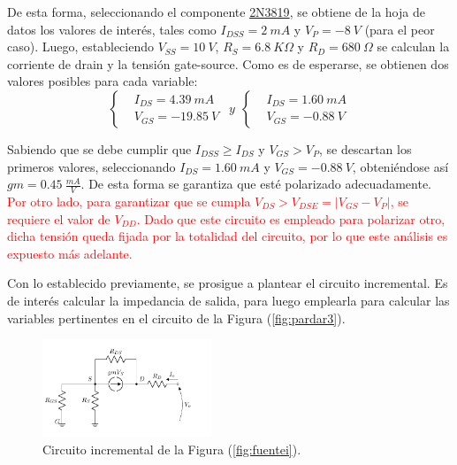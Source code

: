 De esta forma, seleccionando el componente \href{https://www.onsemi.com/pub/Collateral/2N3819-D.PDF}{2N3819}, se obtiene de la hoja de datos los valores de interés, tales como $I_{DSS} = 2 \ mA$ y $V_P = -8 \ V$ (para el peor caso). Luego, estableciendo $V_{SS} = 10 \ V$, $R_S = 6.8 \ K\Omega$ y $R_D = 680 \ \Omega$ se calculan la corriente de drain y la tensión gate-source. Como es de esperarse, se obtienen dos valores posibles para cada variable:
\begin{equation*}
\left\lbrace
\begin{split}
	&I_{DS} =  4.39 \ mA \\
	&V_{GS} =  -19.85 \ V
\end{split}
\right.
\ \ y \ \
\left\lbrace
\begin{split}
	&I_{DS} =  1.60 \ mA \\
	&V_{GS} =  -0.88 \ V
\end{split}
\right.
\end{equation*}

Sabiendo que se debe cumplir que $I_{DSS} \geq I_{DS}$ y $V_{GS} > V_{P}$, se descartan los primeros valores, seleccionando $I_{DS} = 1.60 \ mA$ y $V_{GS} = -0.88 \ V$, obteniéndose así $gm = 0.45 \ \frac{mA}{V}$. De esta forma se garantiza que esté polarizado adecuadamente. \textcolor{red}{Por otro lado, para garantizar que se cumpla $V_{DS} > V_{DSE} = |V_{GS} - V_P|$, se requiere el valor de $V_{DD}$. Dado que este circuito es empleado para polarizar otro, dicha tensión queda fijada por la totalidad del circuito, por lo que este análisis es expuesto más adelante.}

Con lo establecido previamente, se prosigue a plantear el circuito incremental. Es de interés calcular la impedancia de salida, para luego emplearla para calcular las variables pertinentes en el circuito de la Figura (\ref{fig:pardar3}).
\begin{figure}[H]
\centering
	\includegraphics[width=0.45\textwidth, page=1]{Imagenes/ModeloIncremental.pdf}
	\caption{Circuito incremental de la Figura (\ref{fig:fuentei}).}
\label{fig:incfuente1}
\end{figure}

